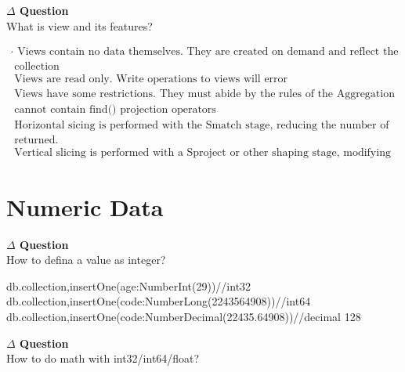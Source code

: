 \documentclass[12pt]{article}
\newenvironment{que}
    { \begin{mdframed}[backgroundcolor=green!20] \textbf{$\Delta$ Question} \\}
    {  \end{mdframed}}
\begin{document}
\begin{code}
\begin{que}
What is view and its features?
\end{que}
$$
\begin{array}{l}{\cdot \text { Views contain no data themselves. They are created on demand and reflect the data in the source }} \\ {\text { collection }} \\ {\text { Views are read only. Write operations to views will error }} \\ {\text { Views have some restrictions. They must abide by the rules of the Aggregation Framework, and }} \\ {\text { cannot contain find() projection operators }} \\ {\text { Horizontal sicing is performed with the Smatch stage, reducing the number of documents that are }} \\ {\text { returned. }} \\ {\text { Vertical slicing is performed with a Sproject or other shaping stage, modifying individual documents. }}\end{array}
$$

\newpage
\section{Numeric Data}
\begin{que}
How to defina a value as integer?
\end{que}
\begin{code}
db.collection,insertOne({age:NumberInt(29)})//int32
db.collection,insertOne({code:NumberLong(2243564908)})//int64
db.collection,insertOne({code:NumberDecimal(22435.64908)})//decimal 128
\end{code}
\begin{que}
How to do math with int32/int64/float?
\end{que}


\newpage

\end{code}
\end{document}

